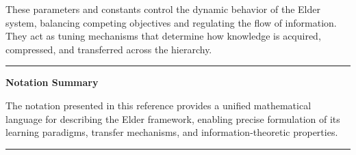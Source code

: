 \vspace{1cm}
\begin{center}
These parameters and constants control the dynamic behavior of the Elder system, balancing competing objectives and regulating the flow of information. They act as tuning mechanisms that determine how knowledge is acquired, compressed, and transferred across the hierarchy.
\end{center}

\clearpage
\begin{center}
\rule{0.8\textwidth}{0.5pt}

\vspace{1cm}
{\Large \textbf{Notation Summary}}
\vspace{0.5cm}

The notation presented in this reference provides a unified mathematical language for describing the Elder framework, enabling precise formulation of its learning paradigms, transfer mechanisms, and information-theoretic properties.

\vspace{0.5cm}
\rule{0.8\textwidth}{0.5pt}
\end{center}